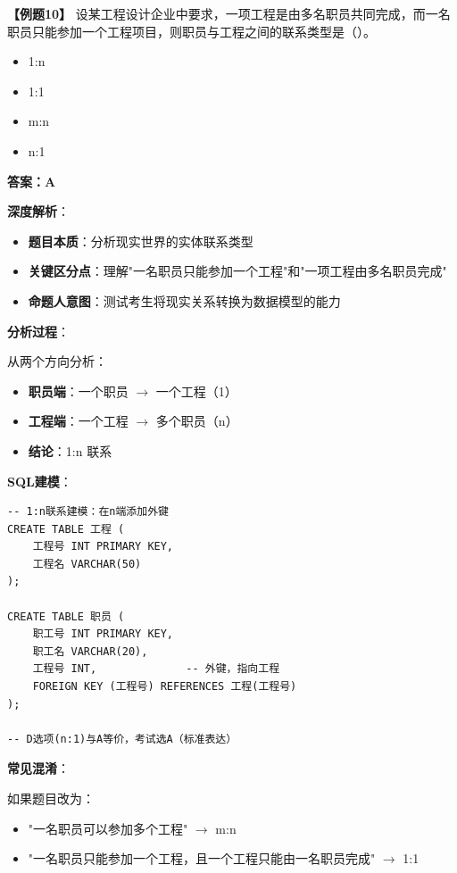 \documentclass[12pt, a4paper]{article}
\newenvironment{bluebox}[1]{%
  \begin{trivlist}
  \item[\hskip\labelsep \textbf{#1}]
  \setlength{\parskip}{0.5ex}
  \setlength{\itemsep}{0.5ex}
}{%
  \end{trivlist}
  }
\begin{document}
\begin{bluebox}{例题10：联系类型判断}
	\textbf{【例题10】} 设某工程设计企业中要求，一项工程是由多名职员共同完成，而一名职员只能参加一个工程项目，则职员与工程之间的联系类型是（\quad）。

	\begin{itemize}
		\item[A)] 1:n
		\item[B)] 1:1
		\item[C)] m:n
		\item[D)] n:1
	\end{itemize}

	\textbf{答案：A}

	\textbf{深度解析}：

	\begin{itemize}[leftmargin=*, nosep]
		\item \textbf{题目本质}：分析现实世界的实体联系类型
		\item \textbf{关键区分点}：理解"一名职员只能参加一个工程"和"一项工程由多名职员完成"
		\item \textbf{命题人意图}：测试考生将现实关系转换为数据模型的能力
	\end{itemize}

	\textbf{分析过程}：

	从两个方向分析：

	\begin{itemize}
		\item \textbf{职员端}：一个职员 $\to$ 一个工程（1）
		\item \textbf{工程端}：一个工程 $\to$ 多个职员（n）
		\item \textbf{结论}：1:n 联系
	\end{itemize}

	\textbf{SQL建模}：
	\begin{verbatim}
-- 1:n联系建模：在n端添加外键
CREATE TABLE 工程 (
    工程号 INT PRIMARY KEY,
    工程名 VARCHAR(50)
);

CREATE TABLE 职员 (
    职工号 INT PRIMARY KEY,
    职工名 VARCHAR(20),
    工程号 INT,              -- 外键，指向工程
    FOREIGN KEY (工程号) REFERENCES 工程(工程号)
);

-- D选项(n:1)与A等价，考试选A（标准表达）
	\end{verbatim}

	\textbf{常见混淆}：

	如果题目改为：
	\begin{itemize}
		\item "一名职员可以参加多个工程" $\to$ m:n
		\item "一名职员只能参加一个工程，且一个工程只能由一名职员完成" $\to$ 1:1
	\end{itemize}


\end{bluebox}
\end{document}

